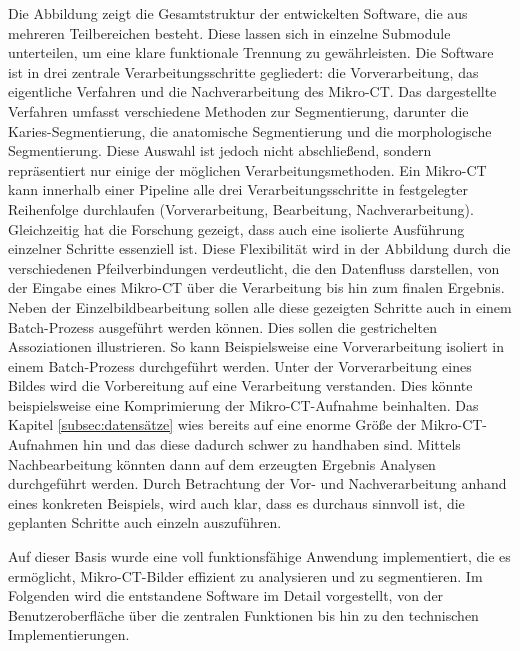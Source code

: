 Die Abbildung zeigt die Gesamtstruktur der entwickelten Software, die aus mehreren
Teilbereichen besteht. Diese lassen sich in einzelne Submodule unterteilen, um eine
klare funktionale Trennung zu gewährleisten. Die Software ist in drei zentrale
Verarbeitungsschritte gegliedert: die Vorverarbeitung, das eigentliche Verfahren
und die Nachverarbeitung des Mikro-\ac{CT}. Das dargestellte Verfahren umfasst
verschiedene Methoden zur Segmentierung, darunter die Karies-Segmentierung, die
anatomische Segmentierung und die morphologische Segmentierung. Diese Auswahl ist
jedoch nicht abschließend, sondern repräsentiert nur einige der möglichen
Verarbeitungsmethoden. Ein Mikro-\ac{CT} kann innerhalb einer Pipeline alle drei
Verarbeitungsschritte in festgelegter Reihenfolge durchlaufen (Vorverarbeitung,
Bearbeitung, Nachverarbeitung). Gleichzeitig hat die Forschung gezeigt, dass
auch eine isolierte Ausführung einzelner Schritte essenziell ist. Diese Flexibilität
wird in der Abbildung durch die verschiedenen Pfeilverbindungen verdeutlicht,
die den Datenfluss darstellen, von der Eingabe eines Mikro-\ac{CT} über die
Verarbeitung bis hin zum finalen Ergebnis. Neben der Einzelbildbearbeitung sollen
alle diese gezeigten Schritte auch in einem Batch-Prozess ausgeführt werden können.
Dies sollen die gestrichelten Assoziationen illustrieren. So kann Beispielsweise
eine Vorverarbeitung isoliert in einem Batch-Prozess durchgeführt werden. Unter
der Vorverarbeitung eines Bildes wird die Vorbereitung auf eine Verarbeitung
verstanden. Dies könnte beispielsweise eine Komprimierung der Mikro-\ac{CT}-Aufnahme
beinhalten. Das Kapitel \ref{subsec:datensätze} wies bereits auf eine enorme Größe
der Mikro-\ac{CT}-Aufnahmen hin und das diese dadurch schwer zu handhaben sind. Mittels
Nachbearbeitung könnten dann auf dem erzeugten Ergebnis Analysen durchgeführt werden.
Durch Betrachtung der Vor- und Nachverarbeitung anhand eines konkreten Beispiels,
wird auch klar, dass es durchaus sinnvoll ist, die geplanten Schritte auch
einzeln auszuführen.

Auf dieser Basis wurde eine voll funktionsfähige Anwendung implementiert, die es
ermöglicht, Mikro-\ac{CT}-Bilder effizient zu analysieren und zu segmentieren.
Im Folgenden wird die entstandene Software im Detail vorgestellt, von der Benutzeroberfläche
über die zentralen Funktionen bis hin zu den technischen Implementierungen.

